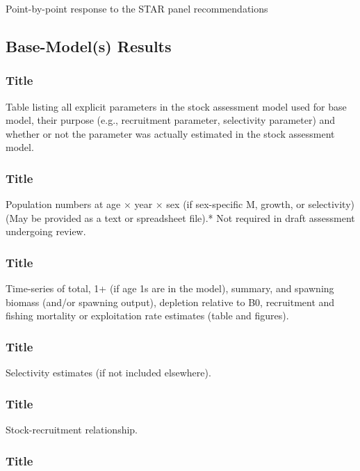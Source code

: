 \documentclass[12pt,]{article}
\begin{document}
Point-by-point response to the STAR panel recommendations

\subsection{Base-Model(s) Results}\label{base-models-results}

\subsubsection{Title}\label{title-23}

Table listing all explicit parameters in the stock assessment model used
for base model, their purpose (e.g., recruitment parameter, selectivity
parameter) and whether or not the parameter was actually estimated in
the stock assessment model.

\subsubsection{Title}\label{title-24}

Population numbers at age × year × sex (if sex-specific M, growth, or
selectivity) (May be provided as a text or spreadsheet file).* Not
required in draft assessment undergoing review.

\subsubsection{Title}\label{title-25}

Time-series of total, 1+ (if age 1s are in the model), summary, and
spawning biomass (and/or spawning output), depletion relative to B0,
recruitment and fishing mortality or exploitation rate estimates (table
and figures).

\subsubsection{Title}\label{title-26}

Selectivity estimates (if not included elsewhere).

\subsubsection{Title}\label{title-27}

Stock-recruitment relationship.

\subsubsection{Title}\label{title-28}
\end{document}
